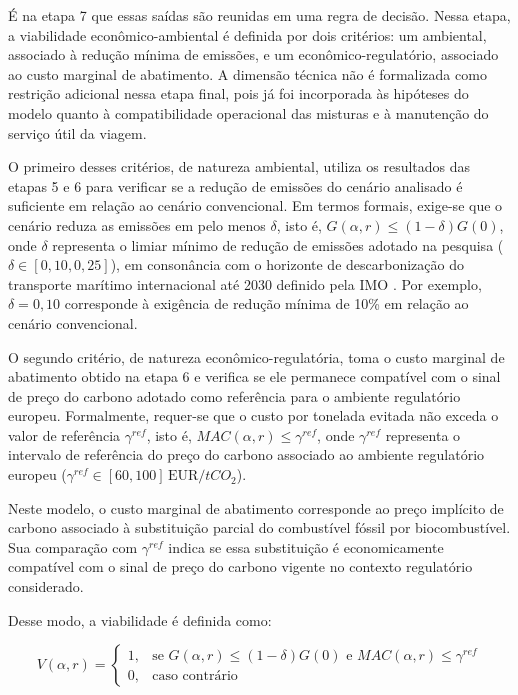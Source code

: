 É na etapa 7 que essas saídas são reunidas em uma regra de decisão. Nessa etapa, a viabilidade econômico-ambiental é definida por dois critérios: um ambiental, associado à redução mínima de emissões, e um econômico-regulatório, associado ao custo marginal de abatimento. A dimensão técnica não é formalizada como restrição adicional nessa etapa final, pois já foi incorporada às hipóteses do modelo quanto à compatibilidade operacional das misturas e à manutenção do serviço útil da viagem.

O primeiro desses critérios, de natureza ambiental, utiliza os resultados das etapas 5 e 6 para verificar se a redução de emissões do cenário analisado é suficiente em relação ao cenário convencional. Em termos formais, exige-se que o cenário reduza as emissões em pelo menos $\delta$, isto é, $G(\alpha,r) \leq (1-\delta)G(0)$, onde $\delta$ representa o limiar mínimo de redução de emissões adotado na pesquisa ($\delta \in [0{,}10,0{,}25]$), em consonância com o horizonte de descarbonização do transporte marítimo internacional até 2030 definido pela \gls{IMO} \citep{imo2023strategy}. Por exemplo, $\delta = 0{,}10$ corresponde à exigência de redução mínima de 10\% em relação ao cenário convencional.

O segundo critério, de natureza econômico-regulatória, toma o custo marginal de abatimento obtido na etapa 6 e verifica se ele permanece compatível com o sinal de preço do carbono adotado como referência para o ambiente regulatório europeu. Formalmente, requer-se que o custo por tonelada evitada não exceda o valor de referência $\gamma^{ref}$, isto é, $MAC(\alpha,r) \leq \gamma^{ref}$, onde $\gamma^{ref}$ representa o intervalo de referência do preço do carbono associado ao ambiente regulatório europeu ($\gamma^{ref} \in [60,100]\,\text{EUR}/tCO_2$).

Neste modelo, o custo marginal de abatimento corresponde ao preço implícito de carbono associado à substituição parcial do combustível fóssil por biocombustível. Sua comparação com $\gamma^{ref}$ indica se essa substituição é economicamente compatível com o sinal de preço do carbono vigente no contexto regulatório considerado.

Desse modo, a viabilidade é definida como:

\[
V(\alpha,r) =
\begin{cases}
1, & \text{se } G(\alpha,r) \leq (1-\delta)G(0)
\text{ e } MAC(\alpha,r) \leq \gamma^{ref} \\
0, & \text{caso contrário}
\end{cases}
\]

